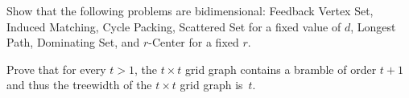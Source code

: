 \documentclass[english]{uebung_cs}
\begin{document}
\begin{exercise}[Bidimensionality]
  Show that the following problems are bidimensional: Feedback Vertex Set, Induced Matching, Cycle Packing, Scattered Set for a fixed value of $d$, Longest Path, Dominating Set, and $r$-Center for a fixed $r$.
\end{exercise}

\begin{exercise}
  Prove that for every $t > 1$, the $t\times t$ grid graph contains a bramble of order $t + 1$ and thus the treewidth of the $t\times t$ grid graph is~$t$.
\end{exercise}
\end{document}
